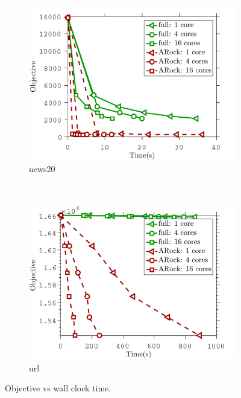 \begin{figure}[!h]
        \centering
       \begin{subfigure}[b]{0.4\textwidth}
                \includegraphics[width=\textwidth]{./figs/news20_obj}
                \caption{news20}
        \end{subfigure}
        ~~
        \begin{subfigure}[b]{0.4\textwidth}
                \includegraphics[width=\textwidth]{./figs/url_obj}
                \caption{url}
        \end{subfigure} 
        \caption{Objective vs wall clock time.}\label{fig:log_reg_obj}
\end{figure}

